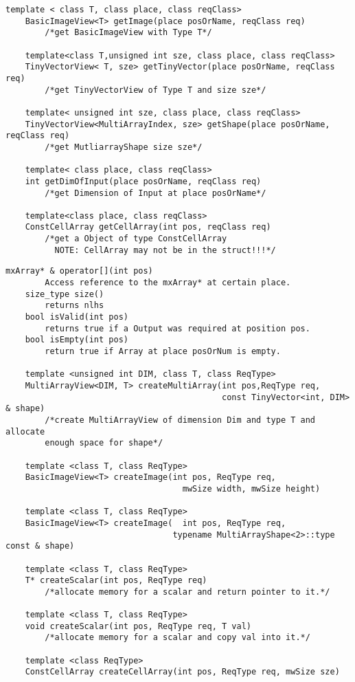 \documentclass[a4paper,10pt]{article}
\begin{document}
\begin{lstlisting}[caption={matlab::InputArray}]
	template < class T, class place, class reqClass>
	BasicImageView<T> getImage(place posOrName, reqClass req)
		/*get BasicImageView with Type T*/

	template<class T,unsigned int sze, class place, class reqClass>
	TinyVectorView< T, sze> getTinyVector(place posOrName, reqClass req)
		/*get TinyVectorView of Type T and size sze*/

	template< unsigned int sze, class place, class reqClass>
	TinyVectorView<MultiArrayIndex, sze> getShape(place posOrName, reqClass req)
		/*get MutliarrayShape size sze*/

	template< class place, class reqClass>
	int getDimOfInput(place posOrName, reqClass req)
		/*get Dimension of Input at place posOrName*/

	template<class place, class reqClass>
	ConstCellArray getCellArray(int pos, reqClass req)
		/*get a Object of type ConstCellArray
		  NOTE: CellArray may not be in the struct!!!*/
\end{lstlisting}
\begin{lstlisting}[caption={matlab::OutputArray}]
	mxArray* & operator[](int pos)
		Access reference to the mxArray* at certain place.
	size_type size()
		returns nlhs
	bool isValid(int pos)
		returns true if a Output was required at position pos.
	bool isEmpty(int pos)
		return true if Array at place posOrNum is empty.	

	template <unsigned int DIM, class T, class ReqType>
	MultiArrayView<DIM, T> createMultiArray(int pos,ReqType req,
                                            const TinyVector<int, DIM>  & shape)
		/*create MultiArrayView of dimension Dim and type T and allocate 
		enough space for shape*/

	template <class T, class ReqType>
	BasicImageView<T> createImage(int pos, ReqType req,
                                    mwSize width, mwSize height)

	template <class T, class ReqType>
	BasicImageView<T> createImage(  int pos, ReqType req,
                                  typename MultiArrayShape<2>::type const & shape)

	template <class T, class ReqType>
	T* createScalar(int pos, ReqType req)
		/*allocate memory for a scalar and return pointer to it.*/

	template <class T, class ReqType>
	void createScalar(int pos, ReqType req, T val)
		/*allocate memory for a scalar and copy val into it.*/

	template <class ReqType>
	ConstCellArray createCellArray(int pos, ReqType req, mwSize sze)
\end{lstlisting}
\end{document}
